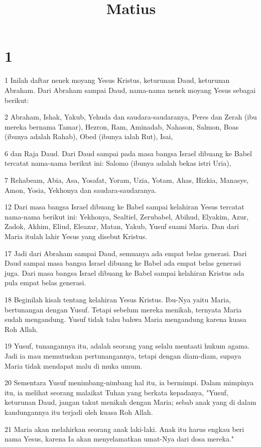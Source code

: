 

\title{Matius}


\chapter{1}

\par 1 Inilah daftar nenek moyang Yesus Kristus, keturunan Daud, keturunan Abraham. Dari Abraham sampai Daud, nama-nama nenek moyang Yesus sebagai berikut:
\par 2 Abraham, Ishak, Yakub, Yehuda dan saudara-saudaranya, Peres dan Zerah (ibu mereka bernama Tamar), Hezron, Ram, Aminadab, Nahason, Salmon, Boas (ibunya adalah Rahab), Obed (ibunya ialah Rut), Isai,
\par 6 dan Raja Daud. Dari Daud sampai pada masa bangsa Israel dibuang ke Babel tercatat nama-nama berikut ini: Salomo (ibunya adalah bekas istri Uria),
\par 7 Rehabeam, Abia, Asa, Yosafat, Yoram, Uzia, Yotam, Ahas, Hizkia, Manasye, Amon, Yosia, Yekhonya dan saudara-saudaranya.
\par 12 Dari masa bangsa Israel dibuang ke Babel sampai kelahiran Yesus tercatat nama-nama berikut ini: Yekhonya, Sealtiel, Zerubabel, Abihud, Elyakim, Azur, Zadok, Akhim, Eliud, Eleazar, Matan, Yakub, Yusuf suami Maria. Dan dari Maria itulah lahir Yesus yang disebut Kristus.
\par 17 Jadi dari Abraham sampai Daud, semuanya ada empat belas generasi. Dari Daud sampai masa bangsa Israel dibuang ke Babel ada empat belas generasi juga. Dari masa bangsa Israel dibuang ke Babel sampai kelahiran Kristus ada pula empat belas generasi.
\par 18 Beginilah kisah tentang kelahiran Yesus Kristus. Ibu-Nya yaitu Maria, bertunangan dengan Yusuf. Tetapi sebelum mereka menikah, ternyata Maria sudah mengandung. Yusuf tidak tahu bahwa Maria mengandung karena kuasa Roh Allah.
\par 19 Yusuf, tunangannya itu, adalah seorang yang selalu mentaati hukum agama. Jadi ia mau memutuskan pertunangannya, tetapi dengan diam-diam, supaya Maria tidak mendapat malu di muka umum.
\par 20 Sementara Yusuf menimbang-nimbang hal itu, ia bermimpi. Dalam mimpinya itu, ia melihat seorang malaikat Tuhan yang berkata kepadanya, "Yusuf, keturunan Daud, jangan takut menikah dengan Maria; sebab anak yang di dalam kandungannya itu terjadi oleh kuasa Roh Allah.
\par 21 Maria akan melahirkan seorang anak laki-laki. Anak itu harus engkau beri nama Yesus, karena Ia akan menyelamatkan umat-Nya dari dosa mereka."

